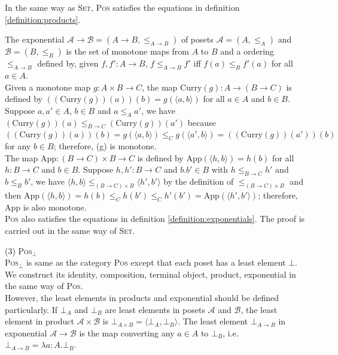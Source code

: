 \begin{myitemize}
\begin{myitemize}
  In the same way as \textsc{Set}, \textsc{Pos} satisfies the equations in definition \ref{definition:products}.
  \item The exponential $ \mathcal{A} \to \mathcal{B} = (A \to B, \leq_{A \to B}) $ of posets $ \mathcal{A} = (A,\leq _A) $ and $ \mathcal{B} = (B,\leq _B) $ is the set of monotone maps from $ A $ to $ B $ and a ordering $ \leq_{A \to B} $ defined by, given $ f, f' : A \to B $, $ f \leq_{A \to B} f' $ iff $ f(a) \leq_B f'(a) $ for all $ a \in A $.\\
  Given a monotone map $ g: A \times B \to C $, the map $ \text{Curry}(g): A \to (B \to C) $ is defined by $ ((\text{Curry}(g))(a))(b) = g( \langle a,b \rangle ) $ for all $ a \in A $ and $ b \in B $. Suppose $ a,a' \in A $, $ b \in B $ and $ a \leq_A a' $, we have $ (\text{Curry}(g))(a) \leq_{B \to C} (\text{Curry}(g))(a') $ because $ ((\text{Curry}(g))(a))(b) = g( \langle a,b \rangle ) \leq_C g( \langle a',b \rangle ) = ((\text{Curry}(g))(a'))(b) $ for any $ b \in B $; therefore, (g) is monotone.\\
  The map $ \text{App} : (B \to C) \times B \to C $ is defined by $ \text{App}( \langle h,b \rangle ) = h(b) $ for all $ h: B \to C $ and $ b \in B $. Suppose $ h,h': B \to C $ and $ b.b' \in B $ with $ h \leq_{B \to C} h' $ and $ b \leq_B b' $, we have $ \langle h,b \rangle \leq_{(B \to C) \times B} \langle h',b' \rangle $ by the definition of $ \leq_{(B \to C) \times B} $ and then $ \text{App}( \langle h,b \rangle ) = h(b) \leq_C h(b') \leq_C h'(b') = \text{App}( \langle h',b' \rangle ) $; therefore, $ \text{App} $ is also monotone.\\
  \textsc{Pos} also satisfies the equations in definition \ref{definition:exponentials}. The proof is carried out in the same way of \textsc{Set}.
  \end{myitemize}
\item[(3)] \textsc{Pos}$_\bot$\\
\textsc{Pos}$_\bot$ is same as the category \textsc{Pos} except that each poset has a least element $ \bot $. We construct its identity, composition, terminal object, product, exponential in the same way of \textsc{Pos}.\\
However, the least elements in products and exponential should be defined particularly. If $ \bot _A $ and $ \bot _B $ are least elements in posets $ \mathcal{A} $ and $ \mathcal{B} $, the least element in product $ \mathcal{A} \times \mathcal{B} $ is $ \bot _{A \times B} = \langle \bot _A , \bot _B \rangle $. The least element $ \bot _{A \to B} $ in exponential $ \mathcal{A} \to \mathcal{B} $ is the map converting any $ a \in A $ to $ \bot _B $, i.e. $ \bot _{A \to B} = \lambda a:A. \bot _B $.\\

\end{myitemize}
